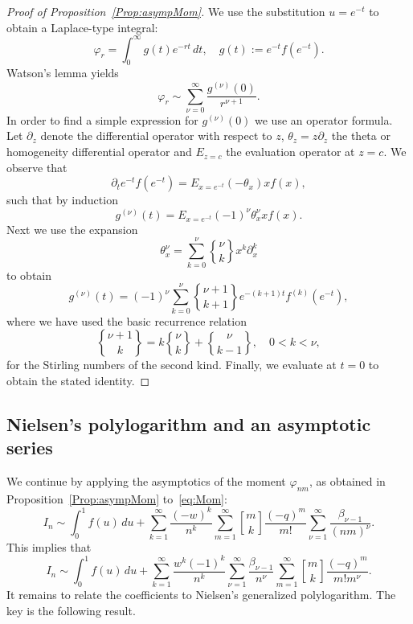 \documentclass[10pt,reqno,a4paper]{amsart}%
\theoremstyle{definition}
\begin{document}
\begin{proof}
[Proof of Proposition~\ref{Prop:asympMom}]We use the substitution $u=e^{-t}$
to obtain a Laplace-type integral:
\[
\varphi_{r}=\int_{0}^{\infty}g(t)e^{-rt}\,dt,\quad g(t):=e^{-t}f(e^{-t}).
\]
Watson's lemma yields
\[
\varphi_{r}\sim\sum_{\nu=0}^{\infty}\frac{g^{(\nu)}(0)}{r^{\nu+1}}.
\]
In order to find a simple expression for $g^{(\nu)}(0)$ we use an operator
formula. Let $\partial_{z}$ denote the differential operator with respect to
$z$, $\theta_{z}=z\partial_{z}$ the theta or homogeneity differential operator
and $E_{z=c}$ the evaluation operator at $z=c$. We observe that
\[
\partial_{t}e^{-t}f(e^{-t})=E_{x=e^{-t}}(-\theta_{x})xf(x),
\]
such that by induction
\[
g^{(\nu)}(t)=E_{x=e^{-t}}(-1)^{\nu}\theta_{x}^{\nu}xf(x).
\]
Next we use the expansion
\[
\theta_{x}^{\nu}=\sum_{k=0}^{\nu}%
\genfrac{\{}{\}}{0pt}{}{\nu}{k}%
x^{k}\partial_{x}^{k}%
\]
to obtain
\[
g^{(\nu)}(t)=(-1)^{\nu}\sum_{k=0}^{\nu}%
\genfrac{\{}{\}}{0pt}{}{\nu+1}{k+1}%
e^{-(k+1)t}f^{(k)}(e^{-t}),
\]
where we have used the basic recurrence relation
\[%
\genfrac{\{}{\}}{0pt}{}{\nu+1}{k}%
=k%
\genfrac{\{}{\}}{0pt}{}{\nu}{k}%
+%
\genfrac{\{}{\}}{0pt}{}{\nu}{k-1}%
,\quad0<k<\nu,
\]
for the Stirling numbers of the second kind. Finally, we evaluate at $t=0$ to
obtain the stated identity.
\end{proof}

\subsection{Nielsen's polylogarithm and an asymptotic series}

We continue by applying the asymptotics of the moment $\varphi_{nm}$, as
obtained in Proposition~\ref{Prop:asympMom} to~\eqref{eq:Mom}:
\[
I_{n}\sim\int_{0}^{1}f(u)\,du+\sum_{k=1}^{\infty}\frac{(-w)^{k}}{n^{k}%
}\sum_{m=1}^{\infty}%
\genfrac{[}{]}{0pt}{}{m}{k}%
\frac{(-q)^{m}}{m!}\sum_{\nu=1}^{\infty}\frac{\beta_{\nu-1}}{(nm)^{\nu}}.
\]
This implies that
\[
I_{n}\sim\int_{0}^{1}f(u)\,du+\sum_{k=1}^{\infty}\frac{w^{k}(-1)^{k}}{n^{k}%
}\sum_{\nu=1}^{\infty}\frac{\beta_{\nu-1}}{n^{\nu}}\sum_{m=1}^{\infty}%
\genfrac{[}{]}{0pt}{}{m}{k}%
\frac{(-q)^{m}}{m!m^{\nu}}.
\]
It remains to relate the coefficients to Nielsen's generalized polylogarithm.
The key is the following result.
\end{document}
